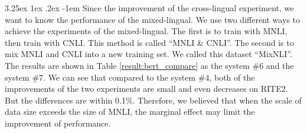 \documentclass[12pt]{article}
\makeatletter
\renewcommand\paragraph{\@startsection{paragraph}{5}{\z@}%
  {3.25ex \@plus1ex \@minus.2ex}%
  {-1em}%
  {\normalfont\normalsize\bfseries}}
\makeatother
\begin{document}
\begin{CJK*}{UTF8}{bkai}
\begin{spacing}{1.77}

\paragraph{}
Since the improvement of the cross-lingual experiment, we want to know the performance of the mixed-lingual. We use two different ways to achieve the experiments of the mixed-lingual. The first is to train with MNLI, then train with CNLI. This method is called ``MNLI \& CNLI''. The second is to mix MNLI and CNLI into a new training set. We called this dataset ``MixNLI''. The results are shown in Table \ref{result:bert_compare} as the system \#6 and the system \#7. We can see that compared to the system \#4, both of the improvements of the two experiments are small and even decreases on RITE2. But the differences are within 0.1\%. Therefore, we believed that when the scale of data size exceeds the size of MNLI, the marginal effect may limit the improvement of performance.


\end{spacing}
\end{CJK*}
\end{document}
